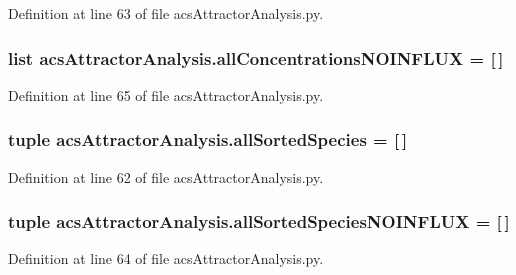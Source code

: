 Definition at line 63 of file acs\-Attractor\-Analysis.\-py.

\hypertarget{a00122_acda16f4751633455ab19e92bdc5baf2a}{
\subsubsection[{all\-Concentrations\-N\-O\-I\-N\-F\-L\-U\-X}]{\setlength{\rightskip}{0pt plus 5cm}list acs\-Attractor\-Analysis.\-all\-Concentrations\-N\-O\-I\-N\-F\-L\-U\-X = \mbox{[}$\,$\mbox{]}}}\label{a00122_acda16f4751633455ab19e92bdc5baf2a}


Definition at line 65 of file acs\-Attractor\-Analysis.\-py.

\hypertarget{a00122_aafc595063b7c4b74f94c0931ff2370a5}{
\subsubsection[{all\-Sorted\-Species}]{\setlength{\rightskip}{0pt plus 5cm}tuple acs\-Attractor\-Analysis.\-all\-Sorted\-Species = \mbox{[}$\,$\mbox{]}}}\label{a00122_aafc595063b7c4b74f94c0931ff2370a5}


Definition at line 62 of file acs\-Attractor\-Analysis.\-py.

\hypertarget{a00122_a02a8db664a67956bc698b79f7c31a7bd}{
\subsubsection[{all\-Sorted\-Species\-N\-O\-I\-N\-F\-L\-U\-X}]{\setlength{\rightskip}{0pt plus 5cm}tuple acs\-Attractor\-Analysis.\-all\-Sorted\-Species\-N\-O\-I\-N\-F\-L\-U\-X = \mbox{[}$\,$\mbox{]}}}\label{a00122_a02a8db664a67956bc698b79f7c31a7bd}


Definition at line 64 of file acs\-Attractor\-Analysis.\-py.

